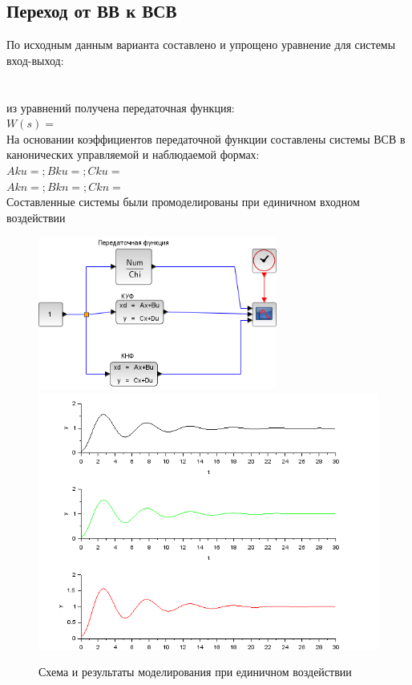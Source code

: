 \documentclass[a4paper,12pt,russian]{article} %
\begin{document}
\subsection{Переход от ВВ к ВСВ}
По исходным данным варианта составлено и упрощено уравнение для системы вход-выход:\\
\\
\\
из уравнений получена передаточная функция:\\
$W(s)=$\\
На основании коэффициентов передаточной функции составлены системы ВСВ в канонических управляемой и наблюдаемой формах:\\
$Aku=;Bku=;Cku=$\\
$Akn=;Bkn=;Ckn=$\\
Составленные системы были промоделированы при единичном входном воздействии\\

\begin{figure}[H]
	\includegraphics[width=0.7\textwidth]{tf}
	\includegraphics[width=1\textwidth]{tf-sim}
	\caption{Схема и результаты моделирования при единичном воздействии}
\end{figure}
\end{document}
